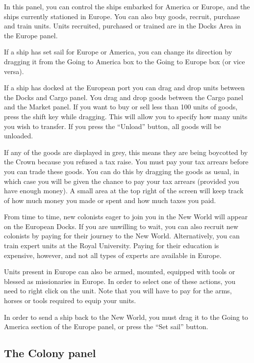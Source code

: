 \documentclass[12pt]{article}
\begin{document}
In this panel, you can control the ships embarked for America or Europe,
and the ships currently stationed in Europe. You can also buy goods,
recruit, purchase and train units. Units recruited, purchased or trained
are in the Docks Area in the Europe panel.

If a ship has set sail for Europe or America, you can change its
direction by dragging it from the Going to America box to the Going
to Europe box (or vice versa).

If a ship has docked at the European port you can drag and drop units
between the Docks and Cargo panel. You drag and drop goods between the
Cargo panel and the Market panel. If you want to buy or sell less than
100 units of goods, press the shift key while dragging. This will
allow you to specify how many units you wish to transfer. If you press
the ``Unload'' button, all goods will be unloaded.

If any of the goods are displayed in grey, this means they are being
boycotted by the Crown because you refused a tax raise. You must pay
your tax arrears before you can trade these goods. You can do this by
dragging the goods as usual, in which case you will be given the
chance to pay your tax arrears (provided you have enough money). A
small area at the top right of the screen will keep track of how much
money you made or spent and how much taxes you paid.

From time to time, new colonists eager to join you in the New World
will appear on the European Docks. If you are unwilling to wait, you
can also recruit new colonists by paying for their journey to the New
World. Alternatively, you can train expert units at the Royal
University. Paying for their education is expensive, however, and not
all types of experts are available in Europe.

Units present in Europe can also be armed, mounted, equipped with
tools or blessed as missionaries in Europe. In order to select one of
these actions, you need to right click on the unit. Note that you will
have to pay for the arms, horses or tools required to equip your
units.

In order to send a ship back to the New World, you must drag it to the
Going to America section of the Europe panel, or press the ``Set
sail'' button.


\hypertarget{colony panel}{\subsection{The Colony panel}}
\end{document}
